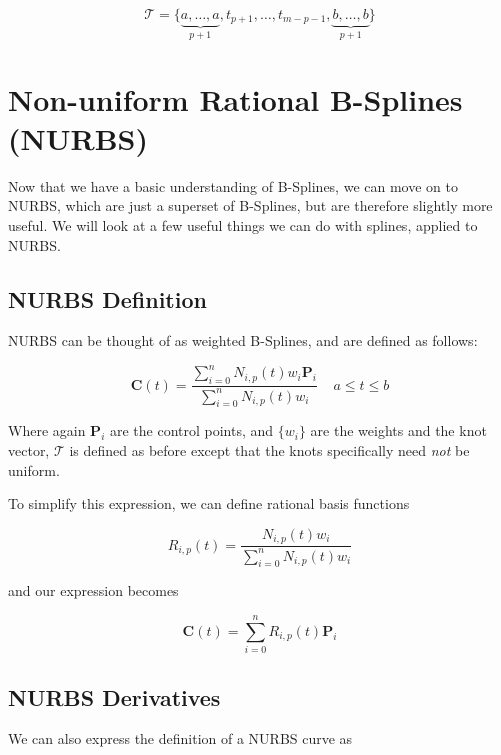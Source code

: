 \begin{equation} \mathcal{T} = \{\underbrace{a,\ldots,a}_{p+1},t_{p+1},\ldots,t_{m-p-1},\underbrace{b,\ldots,b}_{p+1} \}  \end{equation}



\section{Non-uniform Rational B-Splines (NURBS)}
Now that we have a basic understanding of B-Splines, we can move on to NURBS, which are just a superset of B-Splines, but are therefore slightly  more useful. We will look at a few useful things we can do with splines, applied to NURBS.

\subsection{NURBS Definition}
NURBS can be thought of as weighted B-Splines, and are defined as follows:

\begin{equation}\label{eqn:nurbsdef} \textbf{C}(t) = \frac{ \displaystyle \sum^n_{i=0}N_{i,p}(t) w_i \textbf{P}_i }{ \displaystyle \sum^n_{i=0}N_{i,p}(t) w_i }~~~~~a\leq t \leq b \end{equation}  

Where again $\textbf{P}_i$ are the control points, and $\{w_i\}$ are the weights and the knot vector, $\mathcal{T}$ is defined as before except that the knots specifically need \textit{not} be uniform.

To simplify this expression, we can define rational basis functions

\begin{equation} R_{i,p}(t) = \frac{ N_{i,p}(t) w_i } { \displaystyle \sum^n_{i=0}N_{i,p}(t) w_i }\end{equation}  

and our expression becomes

\begin{equation} \textbf{C}(t) = \sum^n_{i=0} R_{i,p}(t) \textbf{P}_i  \end{equation}  


\subsection{NURBS Derivatives}
We can also express the definition of a NURBS curve as


